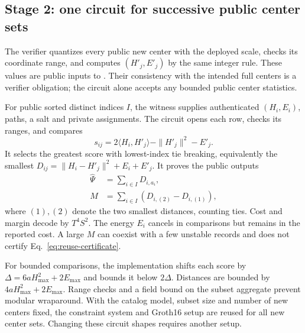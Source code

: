 \subsection{Stage 2: one circuit for successive public center sets}\label{sec:reuse-circuit}
The verifier quantizes every public new center with the deployed scale, checks its coordinate range, and computes $(H'_j,E'_j)$ by the same integer rule. These values are public inputs to . Their consistency with the intended full centers is a verifier obligation; the circuit alone accepts any bounded public center statistics.

For public sorted distinct indices $I$, the witness supplies authenticated $(H_i,E_i)$, paths, a salt and private assignments. The circuit opens each row, checks its ranges, and compares
\begin{equation}
s_{ij}=2\langle H_i,H'_j\rangle-\|H'_j\|^2-E'_j.
\end{equation}
It selects the greatest score with lowest-index tie breaking, equivalently the smallest $D_{ij}=\|H_i-H'_j\|^2+E_i+E'_j$. It proves the public outputs
\begin{align}
\widehat\Psi&=\sum_{i\in I}D_{i,a_i},\nonumber\\
M&=\sum_{i\in I}(D_{i,(2)}-D_{i,(1)}),\label{eq:reuse-outputs}
\end{align}
where $(1),(2)$ denote the two smallest distances, counting ties. Cost and margin decode by $T^4S^2$. The energy $E_i$ cancels in comparisons but remains in the reported cost. A large $M$ can coexist with a few unstable records and does not certify Eq.~\eqref{eq:reuse-certificate}.

For bounded comparisons, the implementation shifts each score by
$\Delta=6aH_{\max}^2+2E_{\max}$ and bounds it below $2\Delta$. Distances are bounded by $4aH_{\max}^2+2E_{\max}$. Range checks and a field bound on the subset aggregate prevent modular wraparound. With the catalog model, subset size and number of new centers fixed, the constraint system and Groth16 setup are reused for all new center sets. Changing these circuit shapes requires another setup.

